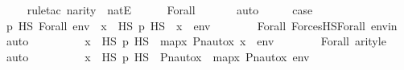 \begin{isabellebody}
\ \ \ \ \isamarkupfalse%
{\isacharparenleft}{\kern0pt}rule{\isacharunderscore}{\kern0pt}tac\ n{\isacharequal}{\kern0pt}{\isachardoublequoteopen}arity{\isacharparenleft}{\kern0pt}{\isasymphi}{\isacharparenright}{\kern0pt}{\isachardoublequoteclose}\ \ natE{\isacharparenright}{\kern0pt}\isanewline
\ \ \ \ \isamarkupfalse%
\ Forall\ \isanewline
\ \ \ \ \isamarkupfalse%
\ auto\isanewline
\isanewline
\ \ \isamarkupfalse%
\ \isamarkupfalse%
\ {\isacharquery}{\kern0pt}case\ \isanewline
\ \ \isamarkupfalse%
\ {\isacharminus}{\kern0pt}\ \isanewline
\ \ \ \ \isamarkupfalse%
\ {\isachardoublequoteopen}p\ {\isasymtturnstile}HS\ Forall{\isacharparenleft}{\kern0pt}{\isasymphi}{\isacharparenright}{\kern0pt}\ env\ {\isasymlongleftrightarrow}\ {\isacharparenleft}{\kern0pt}{\isasymforall}x\ {\isasymin}\ HS{\isachardot}{\kern0pt}\ p\ {\isasymtturnstile}HS\ {\isasymphi}\ {\isacharbrackleft}{\kern0pt}x{\isacharbrackright}{\kern0pt}\ {\isacharat}{\kern0pt}\ env{\isacharparenright}{\kern0pt}{\isachardoublequoteclose}\isanewline
\ \ \ \ \ \ \isamarkupfalse%
\ Forall\ ForcesHS{\isacharunderscore}{\kern0pt}Forall\ envin\ \isamarkupfalse%
\ auto\isanewline
\ \ \ \ \isamarkupfalse%
\ \isamarkupfalse%
\ {\isachardoublequoteopen}{\isachardot}{\kern0pt}{\isachardot}{\kern0pt}{\isachardot}{\kern0pt}\ {\isasymlongleftrightarrow}\ {\isacharparenleft}{\kern0pt}{\isasymforall}x\ {\isasymin}\ HS{\isachardot}{\kern0pt}\ {\isasympi}{\isacharbackquote}{\kern0pt}p\ {\isasymtturnstile}HS\ {\isasymphi}\ map{\isacharparenleft}{\kern0pt}{\isasymlambda}x{\isachardot}{\kern0pt}\ Pn{\isacharunderscore}{\kern0pt}auto{\isacharparenleft}{\kern0pt}{\isasympi}{\isacharparenright}{\kern0pt}{\isacharbackquote}{\kern0pt}x{\isacharcomma}{\kern0pt}\ {\isacharbrackleft}{\kern0pt}x{\isacharbrackright}{\kern0pt}\ {\isacharat}{\kern0pt}\ env{\isacharparenright}{\kern0pt}{\isacharparenright}{\kern0pt}{\isachardoublequoteclose}\isanewline
\ \ \ \ \ \ \isamarkupfalse%
\ Forall\ arityle\ \isamarkupfalse%
\ auto\isanewline
\ \ \ \ \isamarkupfalse%
\ \isamarkupfalse%
\ {\isachardoublequoteopen}{\isachardot}{\kern0pt}{\isachardot}{\kern0pt}{\isachardot}{\kern0pt}\ {\isasymlongleftrightarrow}\ {\isacharparenleft}{\kern0pt}{\isasymforall}x\ {\isasymin}\ HS{\isachardot}{\kern0pt}\ {\isasympi}{\isacharbackquote}{\kern0pt}p\ {\isasymtturnstile}HS\ {\isasymphi}\ {\isacharbrackleft}{\kern0pt}Pn{\isacharunderscore}{\kern0pt}auto{\isacharparenleft}{\kern0pt}{\isasympi}{\isacharparenright}{\kern0pt}{\isacharbackquote}{\kern0pt}x{\isacharbrackright}{\kern0pt}\ {\isacharat}{\kern0pt}\ map{\isacharparenleft}{\kern0pt}{\isasymlambda}x{\isachardot}{\kern0pt}\ Pn{\isacharunderscore}{\kern0pt}auto{\isacharparenleft}{\kern0pt}{\isasympi}{\isacharparenright}{\kern0pt}{\isacharbackquote}{\kern0pt}x{\isacharcomma}{\kern0pt}\ env{\isacharparenright}{\kern0pt}{\isacharparenright}{\kern0pt}{\isachardoublequoteclose}\isanewline

\end{isabellebody}

